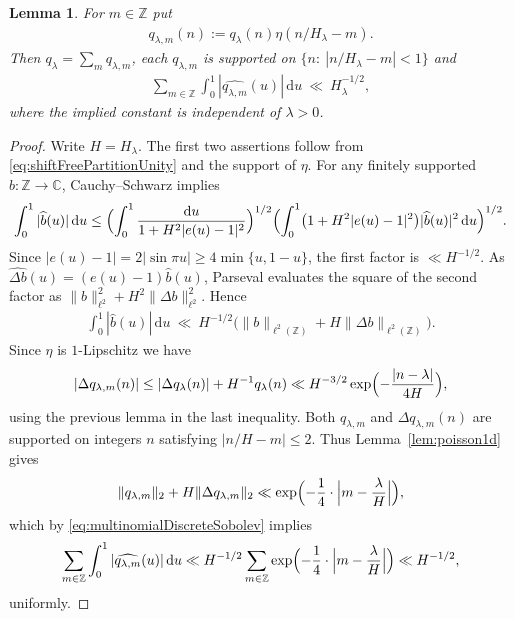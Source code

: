 \documentclass[a4paper,reqno,12pt]{amsart}
\theoremstyle{plain}
\newtheorem{lemma}[theorem]{Lemma}
\theoremstyle{plain}
\theoremstyle{remark}
\theoremstyle{plain}
\newcommand{\z}{\mathbb{Z}}
\newcommand{\cp}{\mathbb{C}} %
\newcommand{\ft}{\widehat}
\newcommand{\la}{\lambda}
\newcommand{\dd}{\mathrm{d}}
\newcommand{\Z}{\mathbb{Z}}
\theoremstyle{plain}
\theoremstyle{plain}
\begin{document}
{\begin{lemma}\label{lem:fouriermass}
For $m\in\z$ put
\begin{align}
q_{\lambda,m}(n):=q_\lambda(n)\eta(n/H_{\la}-m).
\label{eq:localizedMultinomialSequence}
\end{align}
Then $q_\lambda=\sum_mq_{\lambda,m}$, each $q_{\lambda,m}$ is
supported on $\{n:\ |n/H_\lambda-m|<1\}$ and
\begin{align}
\sum_{m\in\z}\int_0^1|\ft{q_{\lambda,m}}(u)|\,\dd u\ \ll\ H_\lambda^{-1/2},
\label{eq:multinomialTotalFourierMass}
\end{align}
where the implied constant {is} independent of $\la >0$.
\end{lemma}

\begin{proof}
Write $H=H_\lambda$. The first two assertions follow from
\eqref{eq:shiftFreePartitionUnity} and the support of $\eta$. For any finitely supported $b:\z\to\cp$, Cauchy--Schwarz implies
\[
\int_0^1|\ft b(u)|\,\dd u
\le\Bigl(\int_0^1\frac{\dd u}{1+H^2|e(u)-1|^2}\Bigr)^{1/2}
\Bigl(\int_0^1\bigl(1+H^2|e(u)-1|^2\bigr)|\ft b(u)|^2\,\dd u\Bigr)^{1/2}.
\]
Since $|e(u)-1|=2|\sin\pi u|\ge4\min\{u,1-u\}$, the first factor is
$\ll H^{-1/2}$. As $\ft{\Delta b}(u)=(e(u)-1)\ft b(u)$, Parseval
evaluates the square of the second factor as
$\|b\|_{\ell^2}^2+H^2\|\Delta b\|_{\ell^2}^2$. Hence
\begin{align}
\int_0^1|\ft b(u)|\,\dd u
\ \ll\ H^{-1/2}\bigl(\|b\|_{\ell^2(\z)}+H\|\Delta b\|_{\ell^2(\z)}\bigr).
\label{eq:multinomialDiscreteSobolev}
\end{align}
Since $\eta$ is $1$-{Lipschitz} we have
\[
|\Delta q_{\lambda,m}(n)|
\le |\Delta q_\lambda(n)|+H^{-1}q_\lambda(n)
\ll H^{-3/2}\exp\Bigl(-  \frac{|n-\lambda|}{4H}\Bigr),
\]
using the previous lemma in the last inequality.
Both $q_{\lambda,m}$ and $\Delta q_{\lambda,m}(n)$ are supported on
integers $n$ satisfying $|n/H-m|\le2$. Thus Lemma~\ref{lem:poisson1d} gives
\[
\|q_{\lambda,m}\|_2+H\|\Delta q_{\lambda,m}\|_2
\ll \exp\Bigl(- \frac{1}{4} \cdot \Bigl|m-\frac\lambda H\Bigr|\Bigr),
\]
which by \eqref{eq:multinomialDiscreteSobolev} implies
\[
\sum_{m\in\Z}\int_0^1|\widehat{q_{\lambda,m}}(u)|\,\dd u
\ll H^{-1/2}\sum_{m\in\Z}
\exp\Bigl(-\frac{1}{4} \cdot \Bigl|m-\frac\lambda H\Bigr|\Bigr)
\ll H^{-1/2},
\]
uniformly.
\end{proof}



}
\end{document}
